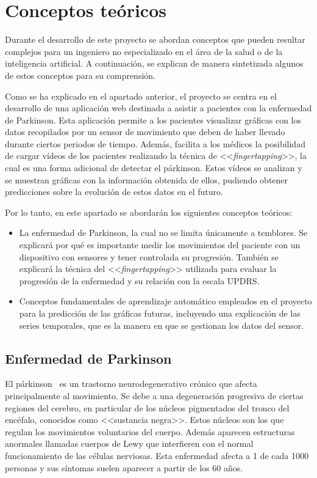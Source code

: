 \chapter{Conceptos teóricos}

Durante el desarrollo de este proyecto se abordan conceptos que pueden resultar complejos para un ingeniero no especializado en el área de la salud o de la inteligencia artificial. A continuación, se explican de manera sintetizada algunos de estos conceptos para su comprensión.

Como se ha explicado en el apartado anterior, el proyecto se centra en el desarrollo de una aplicación web destinada a asistir a pacientes con la enfermedad de Parkinson. Esta aplicación permite a los pacientes visualizar gráficas con los datos recopilados por un sensor de movimiento que deben de haber llevado durante ciertos periodos de tiempo. Además, facilita a los médicos la posibilidad de cargar vídeos de los pacientes realizando la técnica de <<\textit{fingertapping}>>, la cual es una forma adicional de detectar el párkinson. Estos vídeos se analizan y se muestran gráficas con la información obtenida de ellos, pudiendo obtener predicciones sobre la evolución de estos datos en el futuro.

Por lo tanto, en este apartado se abordarán los siguientes conceptos teóricos:
\begin{itemize}
    \item La enfermedad de Parkinson, la cual no se limita únicamente a temblores. Se explicará por qué es importante medir los movimientos del paciente con un dispositivo con sensores y tener controlada su progresión. También se explicará la técnica del <<\textit{fingertapping}>> utilizada para evaluar la progresión de la enfermedad y su relación con la escala UPDRS.
    
    \item Conceptos fundamentales de aprendizaje automático empleados en el proyecto para la predicción de las gráficas futuras, incluyendo una explicación de las series temporales, que es la manera en que se gestionan los datos del sensor.
\end{itemize}



\section{Enfermedad de Parkinson}

El párkinson~\cite{parkinsonDisease} es un trastorno neurodegenerativo crónico que afecta principalmente al movimiento. Se debe a una degeneración progresiva de ciertas regiones del cerebro, en particular de los núcleos pigmentados del tronco del encéfalo, conocidos como <<sustancia negra>>. Estos núcleos son los que regulan los movimientos voluntarios del cuerpo. Además aparecen estructuras anormales llamadas cuerpos de Lewy que interfieren con el normal funcionamiento de las células nerviosas. Esta enfermedad afecta a 1 de cada 1000 personas y sus síntomas suelen aparecer a partir de los 60 años.

